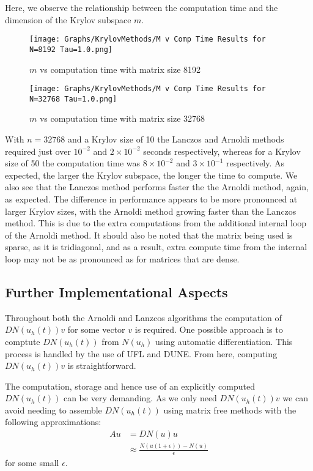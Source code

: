 Here, we observe the relationship between the computation time and the dimension of the Krylov subspace $m$.
\begin{figure}[H]
    \centering
    \begin{minipage}{0.49\textwidth}
        \texttt{[image: Graphs/KrylovMethods/M v Comp Time Results for N=8192 Tau=1.0.png]} %
        \caption{$m$ vs computation time with matrix size 8192}
        \label{fig:mCTKrylov1}
    \end{minipage}\hfill
    \centering
    \begin{minipage}{0.49\textwidth}
        \texttt{[image: Graphs/KrylovMethods/M v Comp Time Results for N=32768 Tau=1.0.png]} %
        \caption{$m$ vs computation time with matrix size 32768}
        \label{fig:mCTKrylov2}
    \end{minipage}\hfill
\end{figure}
With $n=32768$ and a Krylov size of 10 the Lanczos and Arnoldi methods required just over $10^{-2}$ and $2\times 10^{-2}$ seconds respectively,
whereas for a Krylov size of 50 the computation time was $8\times 10^{-2}$ and $3\times 10^{-1}$ respectively.
As expected, the larger the Krylov subspace, the longer the time to compute.
We also see that the Lanczos method performs faster the the Arnoldi method, again, as expected.
The difference in performance appears to be more pronounced at larger Krylov sizes, with the Arnoldi method growing faster than the Lanczos method.
This is due to the extra computations from the additional internal loop of the Arnoldi method.
It should also be noted that the matrix being used is sparse, as it is tridiagonal, and as a result, extra compute time from the internal loop may not be as pronounced as for matrices that are dense.

\subsection{Further Implementational Aspects}
Throughout both the Arnoldi and Lanzcos algorithms the computation of $DN(u_h(t))v$ for some vector $v$ is required.
One possible approach is to comptute $DN(u_h(t))$ from $N(u_h)$ using automatic differentiation.
This process is handled by the use of UFL\cite{Alnaes2014} and DUNE\cite{Bastian2021}.
From here, computing $DN(u_h(t))v$ is straightforward.

The computation, storage and hence use of an explicitly computed $DN(u_h(t))$ can be very demanding.
As we only need $DN(u_h(t))v$ we can avoid needing to assemble $DN(u_h(t))$ using matrix free methods with the following approximations:
\begin{align*}
    Au &= DN(u)u\\
    &\approx \frac{N(u(1+\epsilon))-N(u)}{\epsilon}
\end{align*}
for some small $\epsilon$.